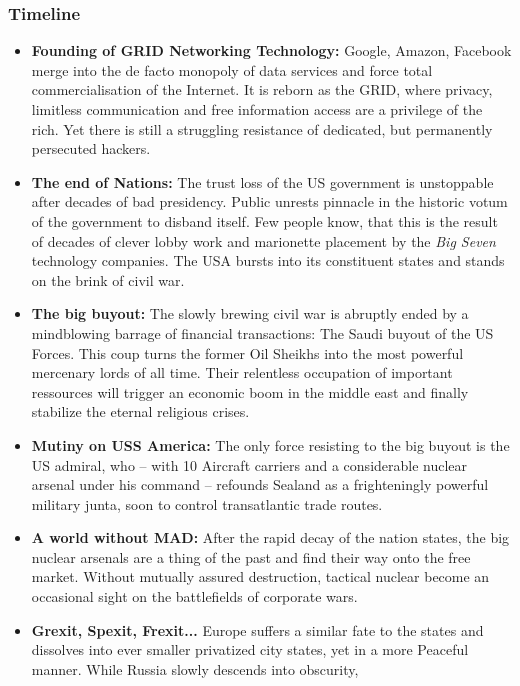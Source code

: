 \documentclass[11pt,a4paper, twocolumn]{article}
\begin{document}
\subsubsection{Timeline}

\begin{itemize}
    \item \textbf{Founding of GRID Networking Technology:} Google, Amazon, Facebook merge into the de
        facto monopoly of data services and force total commercialisation of the Internet. It is reborn
        as the GRID, where privacy, limitless communication and free information access are a privilege
        of the rich. Yet there is still a struggling resistance of dedicated, but permanently persecuted
        hackers.
    \item \textbf{The end of Nations:} The trust loss of the US government is unstoppable after decades
        of bad presidency. Public unrests pinnacle in the historic votum of the government to disband itself. Few people
        know, that this is the result of decades of clever lobby work and marionette placement by the
        \textit{Big Seven} technology companies. The USA bursts into its constituent states and stands on the
        brink of civil war.
    \item \textbf{The big buyout:} The slowly brewing civil war is abruptly ended by a mindblowing barrage of
        financial transactions: The Saudi buyout of the US Forces. This coup
        turns the former Oil Sheikhs into the most powerful mercenary lords of all time. Their relentless
        occupation of important ressources will trigger an economic boom in the middle east and finally
        stabilize the eternal religious crises.
    \item \textbf{Mutiny on USS America:} The only force resisting to the big buyout is the US admiral,
        who -- with 10 Aircraft carriers and a considerable nuclear arsenal under his command -- refounds Sealand as
        a frighteningly powerful military junta, soon to control transatlantic trade routes.
    \item \textbf{A world without MAD:} After the rapid decay of the nation states, the big nuclear arsenals
        are a thing of the past and find their way onto the free market. Without mutually assured destruction,
        tactical nuclear become an occasional sight on the battlefields of corporate wars.
    \item \textbf{Grexit, Spexit, Frexit...} Europe suffers a similar fate to the states and dissolves into
        ever smaller privatized city states, yet in a more Peaceful manner. While Russia slowly descends into obscurity,

\end{itemize}
\end{document}
